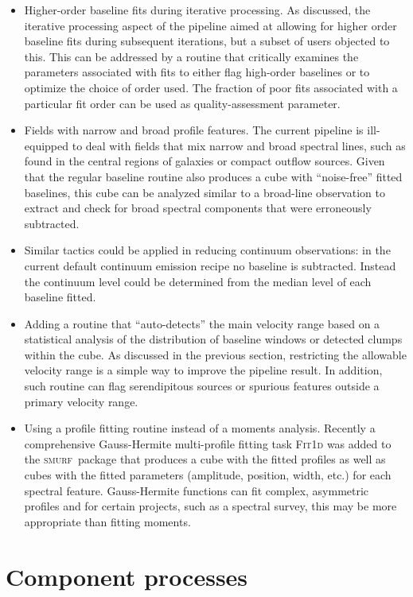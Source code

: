 \documentclass[a4paper,fleqn,usenatbib]{mnras}
\newcommand{\smurf}{\textsc{smurf}}
\begin{document}
\begin{itemize}
\item  Higher-order baseline fits during iterative processing. As discussed, the
iterative processing aspect of the pipeline aimed at allowing for higher order
baseline fits during subsequent iterations, but a subset of users objected
to this. This can be addressed by a routine that critically examines the
parameters associated with fits to either flag high-order baselines
or to optimize the choice of order used. The fraction of poor fits associated
with a particular fit order can be used as quality-assessment parameter.
\item Fields with narrow and broad profile features.  The current pipeline
is ill-equipped to deal with fields that mix narrow and broad spectral
lines, such as found in the central regions of galaxies or compact
outflow sources. Given that the regular baseline routine also produces a
cube with ``noise-free'' fitted baselines, this cube can be analyzed similar to a
broad-line observation to extract and check for broad
spectral components that were erroneously subtracted.
\item Similar tactics could be applied in reducing continuum observations:
in the current default continuum emission recipe no baseline is subtracted. Instead the continuum
level could be determined from the median level of each baseline fitted.
\item Adding a routine that ``auto-detects'' the main velocity range based
on a statistical analysis of the distribution of baseline windows or detected clumps
within the cube. As discussed in the previous section, restricting the allowable
velocity range is a simple way to improve the pipeline result. In addition,
such routine can flag serendipitous sources or spurious features outside
a primary velocity range.
\item Using a profile fitting routine instead of a moments analysis. Recently a
comprehensive Gauss-Hermite multi-profile fitting task \textsc{Fit{\footnotesize{1}}d}
was added to the \smurf\ package that produces a cube with the fitted profiles as well
as cubes with the fitted parameters (amplitude, position, width, etc.) for
each spectral feature. Gauss-Hermite functions can fit complex, asymmetric
profiles and for certain projects, such as a spectral survey, this may be more
appropriate than fitting moments.
\end{itemize}

\section{Component processes}
\end{document}
